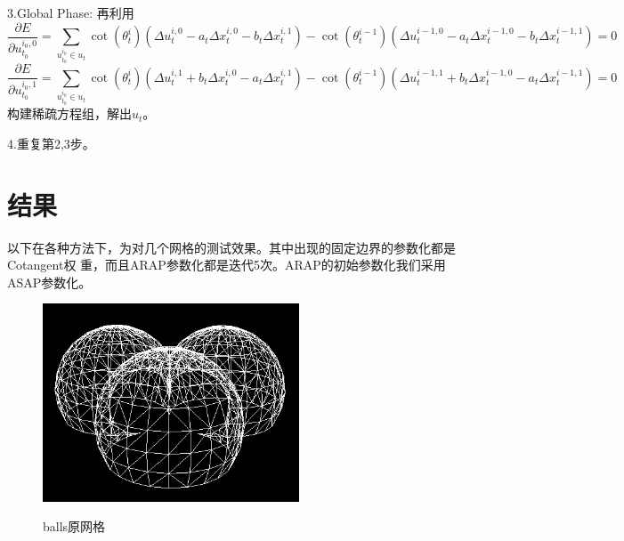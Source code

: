 \documentclass{article}
\begin{document}
	3.Global Phase:
	再利用
	$$\frac{\partial{E}}{\partial{u_{t_0}^{i_0,0}}}=\sum_{u_{t_0}^{i_0}\in u_t}
	\cot{(\theta_t^i)}(\Delta u_t^{i,0}-a_t\Delta x_t^{i,0}-b_t\Delta x_t^{i,1})
	-\cot{(\theta_t^{i-1})}(\Delta u_t^{i-1,0}-a_t\Delta x_t^{i-1,0}-b_t\Delta 
	x_t^{i-1,1})=0
	$$
	$$\frac{\partial{E}}{\partial{u_{t_0}^{i_0,1}}}=\sum_{u_{t_0}^{i_0}\in u_t}
	\cot{(\theta_t^i)}(\Delta u_t^{i,1}+b_t\Delta x_t^{i,0}-a_t\Delta x_t^{i,1})
	-\cot{(\theta_t^{i-1})}(\Delta u_t^{i-1,1}+b_t\Delta x_t^{i-1,0}-a_t\Delta 
	x_t^{i-1,1})=0
	$$
	构建稀疏方程组，解出$u_t$。
	
	4.重复第2,3步。
	\clearpage
	\section{结果}
	以下在各种方法下，为对几个网格的测试效果。其中出现的固定边界的参数化都是Cotangent权
	重，而且ARAP参数化都是迭代5次。ARAP的初始参数化我们采用ASAP参数化。
	\begin{figure}[htb]
		\caption{\label{table.label} balls原网格} \centering
		\begin{center}
			\includegraphics[width=3in]{balls.jpg}
			\label{figure.label}
		\end{center}
	\end{figure}
\end{document}
